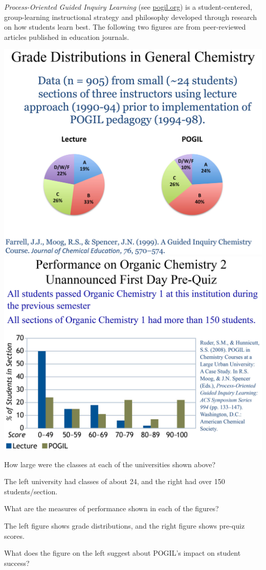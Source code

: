 
\textit{Process-Oriented Guided Inquiry Learning} (see \href{https://pogil.org/}{pogil.org}) is a student-centered, group-learning instructional strategy and philosophy developed through research on how students learn best.
The following two figures are from peer-reviewed articles published in education journals.


\vspace{1em}
\includegraphics[width=0.47\linewidth]{pogil-grades.png}
\hfill
\includegraphics[width=0.50\linewidth]{pogil-prequiz.png}




\Q How large were the classes at each of the universities shown above?

\begin{answer}[2em]
The left university had classes of about 24, and the right had over 150 students/section.
\end{answer}


\Q What are the measures of performance shown in each of the figures?

\begin{answer}[2em]
The left figure shows grade distributions, and the right figure shows pre-quiz scores.
\end{answer}


\Q What does the figure on the left suggest about POGIL's impact on student success?


